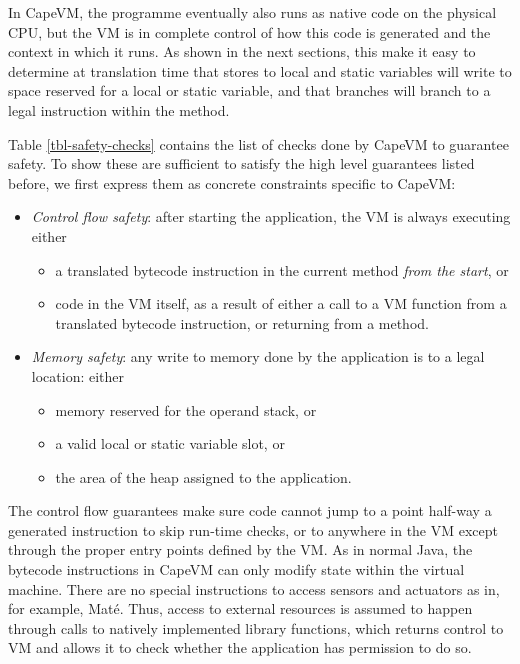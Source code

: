 In CapeVM, the programme eventually also runs as native code on the physical CPU, but the VM is in complete control of how this code is generated and the context in which it runs. As shown in the next sections, this make it easy to determine at translation time that stores to local and static variables will write to space reserved for a local or static variable, and that branches will branch to a legal instruction within the method.

Table \ref{tbl-safety-checks} contains the list of checks done by CapeVM to guarantee safety. To show these are sufficient to satisfy the high level guarantees listed before, we first express them as concrete constraints specific to CapeVM:

\begin{itemize}
    \item \emph{Control flow safety}: after starting the application, the VM is always executing either
        \begin{itemize}
            \item a translated bytecode instruction in the current method \emph{from the start}, or
            \item code in the VM itself, as a result of either a call to a VM function from a translated bytecode instruction, or returning from a method.
        \end{itemize}
    \item \emph{Memory safety}: any write to memory done by the application is to a legal location: either
        \begin{itemize}
            \item memory reserved for the operand stack, or
            \item a valid local or static variable slot, or
            \item the area of the heap assigned to the application.
        \end{itemize}
\end{itemize}

The control flow guarantees make sure code cannot jump to a point half-way a generated instruction to skip run-time checks, or to anywhere in the VM except through the proper entry points defined by the VM. As in normal Java, the bytecode instructions in CapeVM can only modify state within the virtual machine. There are no special instructions to access sensors and actuators as in, for example, Maté. Thus, access to external resources is assumed to happen through calls to natively implemented library functions, which returns control to VM and allows it to check whether the application has permission to do so.

